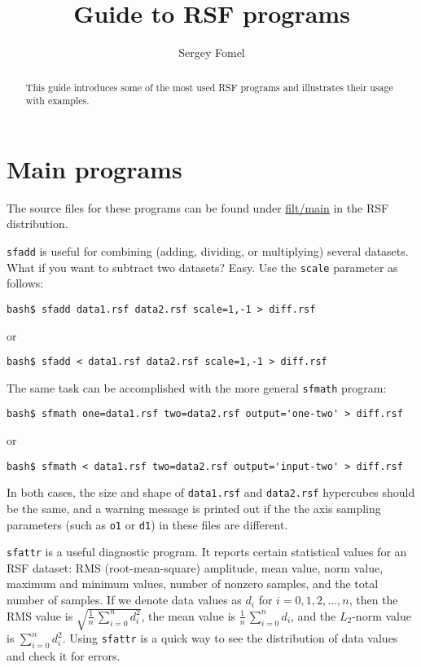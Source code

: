 \title{Guide to RSF programs}
\author{Sergey Fomel}

\maketitle

\begin{abstract}

This guide introduces some of the most used RSF programs and illustrates their
usage with examples.

\end{abstract}

\section{Main programs}

The source files for these programs can be found under
\href{http://egl.beg.utexas.edu/viewcvs/trunk/filt/main/}{filt/main}
in the RSF distribution.

\noindent\doublebox{\parbox{\textwidth}{

}}

\texttt{sfadd} is useful for combining (adding, dividing, or
multiplying) several datasets. What if you want to subtract two
datasets? Easy. Use the \texttt{scale} parameter as follows:
\begin{verbatim}
bash$ sfadd data1.rsf data2.rsf scale=1,-1 > diff.rsf
\end{verbatim}
or
\begin{verbatim}
bash$ sfadd < data1.rsf data2.rsf scale=1,-1 > diff.rsf
\end{verbatim}
The same task can be accomplished with the more general \texttt{sfmath} program:
\begin{verbatim}
bash$ sfmath one=data1.rsf two=data2.rsf output='one-two' > diff.rsf
\end{verbatim}
or
\begin{verbatim}
bash$ sfmath < data1.rsf two=data2.rsf output='input-two' > diff.rsf
\end{verbatim}
In both cases, the size and shape of \texttt{data1.rsf} and
\texttt{data2.rsf} hypercubes should be the same, and a warning
message is printed out if the the axis sampling parameters (such as
\texttt{o1} or \texttt{d1}) in these files are different.

\noindent\doublebox{\parbox{\textwidth}{

}}

\texttt{sfattr} is a useful diagnostic program. It reports certain statistical
values for an RSF dataset: RMS (root-mean-square) amplitude, mean value, norm
value, maximum and minimum values, number of nonzero samples, and the total
number of samples. If we denote data values as $d_i$ for $i=0,1,2,\ldots,n$,
then the RMS value is $\sqrt{\frac{1}{n}\,\sum\limits_{i=0}^n d_i^2}$, the
mean value is $\frac{1}{n}\,\sum\limits_{i=0}^n d_i$, and the $L_2$-norm value
is $\sum\limits_{i=0}^n d_i^2$. Using \texttt{sfattr} is a quick way to see
the distribution of data values and check it for errors.

